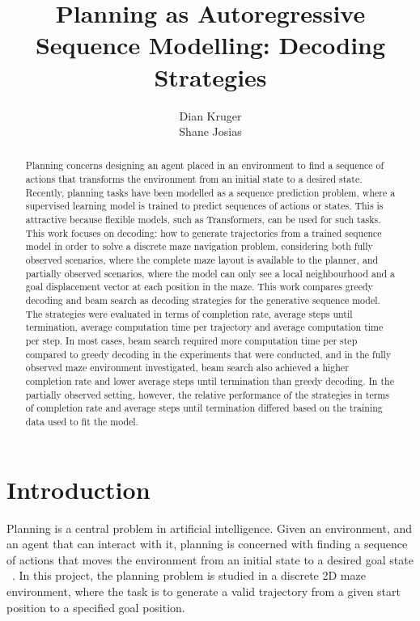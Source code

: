 ﻿\documentclass[12pt,a4paper]{article}
\title{Planning as Autoregressive Sequence Modelling: Decoding Strategies}
\author{Dian Kruger \\ Shane Josias}
\date{}
\let\oldcite\cite
\renewcommand{\cite}[1]{\mbox{\oldcite{#1}}}
\theoremstyle{definition}
\begin{document}
\maketitle

\begin{abstract}

Planning concerns designing an agent placed in an environment to find a sequence of actions that transforms the environment 
from an initial state to a desired state. Recently, planning tasks
have been modelled as a sequence prediction problem, where a supervised	
learning model is trained to predict sequences of actions or states.
This is attractive because flexible models, such as Transformers,
can be used for such tasks. This work focuses on decoding: how to generate trajectories
from a trained sequence model in order to solve a discrete maze navigation problem, considering
both fully observed scenarios, where the complete maze layout is available to the planner,
and partially observed scenarios, where the model can only see a local neighbourhood and a
goal displacement vector at each position in the maze. This work compares
greedy decoding and beam search as decoding strategies for the generative sequence model. The strategies were evaluated in terms
of completion rate, average steps until termination, average computation time per trajectory and
average computation time per step. In most cases, beam search required more computation time
per step compared to greedy decoding in the experiments that were conducted,
and in the fully observed maze environment investigated, beam search also achieved a higher 
completion rate and lower average steps until termination than greedy decoding. In the
partially observed setting, however, the relative performance of the strategies in terms of completion rate and
average steps until termination differed based on
the training data used to fit the model. 
\end{abstract}

\section{Introduction}

Planning is a central problem in artificial intelligence. Given an environment, and an agent that
can interact with it, planning is concerned with finding a sequence of
actions that moves the environment from an initial state to a desired goal state
~\cite{Alarnaouti2023planning}. In this project, the planning problem is studied in a discrete 2D
maze environment, where the task is to generate a valid trajectory from a given start position to a
specified goal position.
\end{document}
